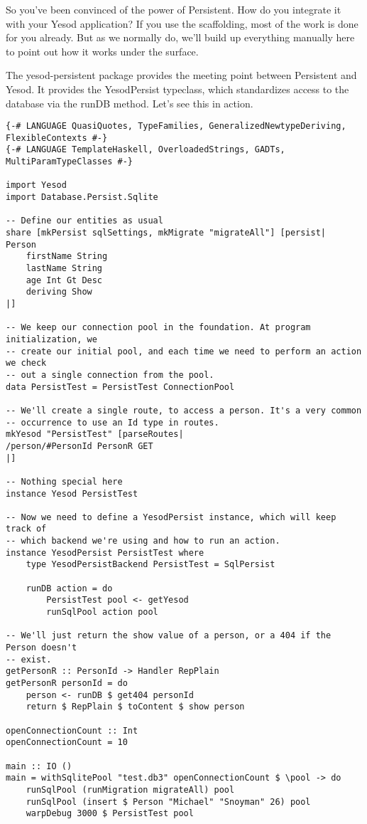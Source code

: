 So you've been convinced of the power of Persistent. How do you integrate it with your Yesod application? If you use the scaffolding, most of the work is done for you already. But as we normally do, we'll build up everything manually here to point out how it works under the surface.

The yesod-persistent package provides the meeting point between Persistent and Yesod. It provides the YesodPersist typeclass, which standardizes access to the database via the runDB method. Let's see this in action.

\begin{lstlisting}
{-# LANGUAGE QuasiQuotes, TypeFamilies, GeneralizedNewtypeDeriving, FlexibleContexts #-}
{-# LANGUAGE TemplateHaskell, OverloadedStrings, GADTs, MultiParamTypeClasses #-}

import Yesod
import Database.Persist.Sqlite

-- Define our entities as usual
share [mkPersist sqlSettings, mkMigrate "migrateAll"] [persist|
Person
    firstName String
    lastName String
    age Int Gt Desc
    deriving Show
|]

-- We keep our connection pool in the foundation. At program initialization, we
-- create our initial pool, and each time we need to perform an action we check
-- out a single connection from the pool.
data PersistTest = PersistTest ConnectionPool

-- We'll create a single route, to access a person. It's a very common
-- occurrence to use an Id type in routes.
mkYesod "PersistTest" [parseRoutes|
/person/#PersonId PersonR GET
|]

-- Nothing special here
instance Yesod PersistTest

-- Now we need to define a YesodPersist instance, which will keep track of
-- which backend we're using and how to run an action.
instance YesodPersist PersistTest where
    type YesodPersistBackend PersistTest = SqlPersist

    runDB action = do
        PersistTest pool <- getYesod
        runSqlPool action pool

-- We'll just return the show value of a person, or a 404 if the Person doesn't
-- exist.
getPersonR :: PersonId -> Handler RepPlain
getPersonR personId = do
    person <- runDB $ get404 personId
    return $ RepPlain $ toContent $ show person

openConnectionCount :: Int
openConnectionCount = 10

main :: IO ()
main = withSqlitePool "test.db3" openConnectionCount $ \pool -> do
    runSqlPool (runMigration migrateAll) pool
    runSqlPool (insert $ Person "Michael" "Snoyman" 26) pool
    warpDebug 3000 $ PersistTest pool
\end{lstlisting}%

